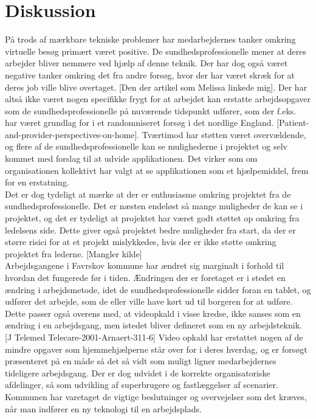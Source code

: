 \section{Diskussion}
På trods af mærkbare tekniske problemer har medarbejdernes tanker omkring virtuelle besøg primært været positive. De sundhedsprofessionelle mener at deres arbejder bliver nemmere ved hjælp af denne teknik. Der har dog også været negative tanker omkring det fra andre forsøg, hvor der har været skræk for at deres job ville blive overtaget. [Den der artikel som Melissa linkede mig]. Der har altså ikke været nogen specifikke frygt for at arbejdet kan erstatte arbejdsopgaver som de sundhedsprofessionelle på nuværende tidspunkt udfører, som der f.eks. har været grundlag for i et randomniseret forsøg i det nordlige England. [Patient-and-provider-perspectives-on-home]. Tværtimod har støtten været overvældende, og flere af de sundhedsprofessionelle kan se mulighederne i projektet og selv kommet med forslag til at udvide applikationen. Det virker som om organisationen kollektivt har valgt at se applikationen som et hjælpemiddel, frem for en erstatning. \\
Det er dog tydeligt at mærke at der er enthusiasme omkring projektet fra de sundhedsprofessionelle. Det er næsten endeløst så mange muligheder de kan se i projektet, og det er tydeligt at projektet har været godt støttet op omkring fra ledelsens side. Dette giver også projektet bedre muligheder fra start, da der er større risici for at et projekt mislykkedes, hvis der er ikke støtte omkring projektet fra lederne. [Mangler kilde] \\
Arbejdsgangene i Favrskov kommune har ændret sig marginalt i forhold til hvordan det fungerede før i tiden. Ændringen der er foretaget er i stedet en ændring i arbejdsmetode, idet de sundhedsprofessionelle sidder foran en tablet, og udfører det arbejde, som de eller ville have kørt ud til borgeren for at udføre. Dette passer også overens med, at videopkald i visse kredse, ikke sanses som en ændring i en arbejdsgang, men istedet bliver defineret som en ny arbejdsteknik. [J Telemed Telecare-2001-Arnaert-311-6] Video opkald har erstattet nogen af de mindre opgaver som hjemmehjælperne står over for i deres hverdag, og er forsøgt præsenteret på en måde så det så vidt som muligt ligner medarbejdernes tideligere arbejdsgang. Der er dog udvidet i de korrekte organisatoriske afdelinger, så som udvikling af superbrugere og fastlæggelser af scenarier. Kommunen har varetaget de vigtige beslutninger og overvejelser som det kræves, når man indfører en ny teknologi til en arbejdsplads. \\
